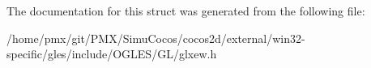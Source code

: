 The documentation for this struct was generated from the following file\+:\begin{DoxyCompactItemize}
\item 
/home/pmx/git/\+P\+M\+X/\+Simu\+Cocos/cocos2d/external/win32-\/specific/gles/include/\+O\+G\+L\+E\+S/\+G\+L/glxew.\+h\end{DoxyCompactItemize}

